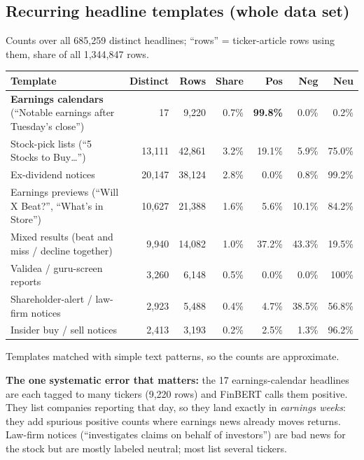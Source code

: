 \documentclass[11pt]{article}
\begin{document}
\subsection{Recurring headline templates (whole data set)}
Counts over all 685,259 distinct headlines; ``rows'' = ticker-article rows using them, share of all 1,344,847 rows.
\begin{center}\small
\begin{tabularx}{\textwidth}{@{}L rrr rrr@{}}
\toprule
Template & Distinct & Rows & Share & Pos & Neg & Neu\\
\midrule
\textbf{Earnings calendars} (``Notable earnings after Tuesday's close'') & 17 & 9,220 & 0.7\% & \textbf{99.8\%} & 0.0\% & 0.2\%\\
Stock-pick lists (``5 Stocks to Buy\ldots'') & 13,111 & 42,861 & 3.2\% & 19.1\% & 5.9\% & 75.0\%\\
Ex-dividend notices & 20,147 & 38,124 & 2.8\% & 0.0\% & 0.8\% & 99.2\%\\
Earnings previews (``Will X Beat?'', ``What's in Store'') & 10,627 & 21,388 & 1.6\% & 5.6\% & 10.1\% & 84.2\%\\
Mixed results (beat and miss / decline together) & 9,940 & 14,082 & 1.0\% & 37.2\% & 43.3\% & 19.5\%\\
Validea / guru-screen reports & 3,260 & 6,148 & 0.5\% & 0.0\% & 0.0\% & 100\%\\
Shareholder-alert / law-firm notices & 2,923 & 5,488 & 0.4\% & 4.7\% & 38.5\% & 56.8\%\\
Insider buy / sell notices & 2,413 & 3,193 & 0.2\% & 2.5\% & 1.3\% & 96.2\%\\
\bottomrule
\end{tabularx}
\end{center}
Templates matched with simple text patterns, so the counts are approximate.

\textbf{The one systematic error that matters:} the 17 earnings-calendar headlines are each tagged to many tickers (9,220 rows) and FinBERT calls them positive. They list companies reporting that day, so they land exactly in \emph{earnings weeks}: they add spurious positive counts where earnings news already moves returns. Law-firm notices (``investigates claims on behalf of investors'') are bad news for the stock but are mostly labeled neutral; most list several tickers.
\end{document}

